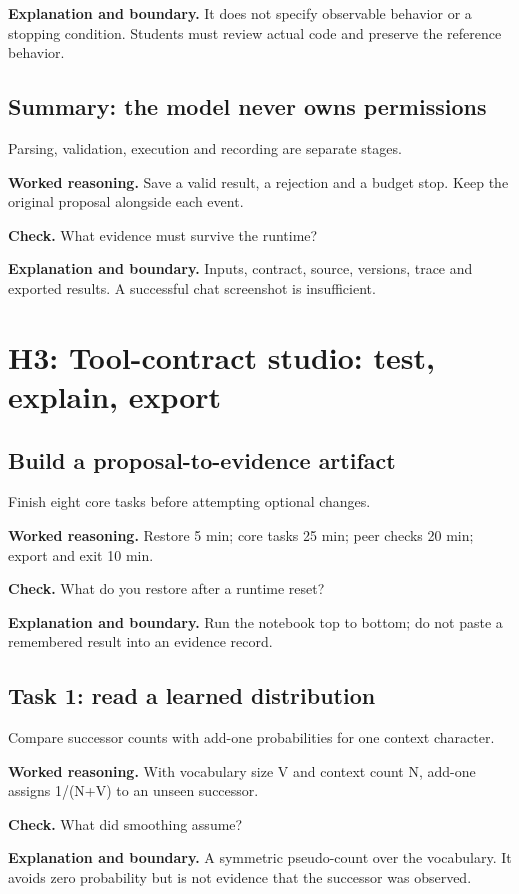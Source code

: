 \textbf{Explanation and boundary.} It does not specify observable behavior or a stopping condition. Students must review actual code and preserve the reference behavior.

\subsection{Summary: the model never owns permissions}
Parsing, validation, execution and recording are separate stages.

\textbf{Worked reasoning.} Save a valid result, a rejection and a budget stop. Keep the original proposal alongside each event.

\textbf{Check.} What evidence must survive the runtime?

\textbf{Explanation and boundary.} Inputs, contract, source, versions, trace and exported results. A successful chat screenshot is insufficient.

\section{H3: Tool-contract studio: test, explain, export}
\subsection{Build a proposal-to-evidence artifact}
Finish eight core tasks before attempting optional changes.

\textbf{Worked reasoning.} Restore 5 min; core tasks 25 min; peer checks 20 min; export and exit 10 min.

\textbf{Check.} What do you restore after a runtime reset?

\textbf{Explanation and boundary.} Run the notebook top to bottom; do not paste a remembered result into an evidence record.

\subsection{Task 1: read a learned distribution}
Compare successor counts with add-one probabilities for one context character.

\textbf{Worked reasoning.} With vocabulary size V and context count N, add-one assigns 1/(N+V) to an unseen successor.

\textbf{Check.} What did smoothing assume?

\textbf{Explanation and boundary.} A symmetric pseudo-count over the vocabulary. It avoids zero probability but is not evidence that the successor was observed.

